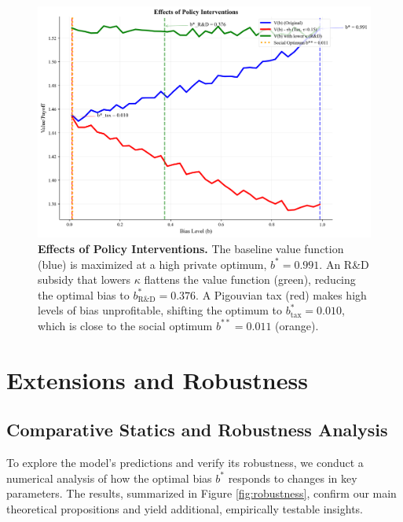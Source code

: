 \documentclass[12pt,a4paper]{article}
\theoremstyle{definition}
\theoremstyle{remark}
\begin{document}
\begin{figure}[H]
    \centering
    \includegraphics[width=1\textwidth]{../figures/figure_2_policy_interventions.png}
    \caption[Effects of Policy Interventions]{\textbf{Effects of Policy Interventions.} The baseline value function (blue) is maximized at a high private optimum, $b^*=0.991$. An R\&D subsidy that lowers $\kappa$ flattens the value function (green), reducing the optimal bias to $b^*_{\text{R\&D}}=0.376$. A Pigouvian tax (red) makes high levels of bias unprofitable, shifting the optimum to $b^*_{\text{tax}}=0.010$, which is close to the social optimum $b^{**}=0.011$ (orange).}
    \label{fig:policy}
\end{figure}

\section{Extensions and Robustness}

\subsection{Comparative Statics and Robustness Analysis}

To explore the model's predictions and verify its robustness, we conduct a numerical analysis of how the optimal bias $b^*$ responds to changes in key parameters. The results, summarized in Figure \ref{fig:robustness}, confirm our main theoretical propositions and yield additional, empirically testable insights.
\end{document}
